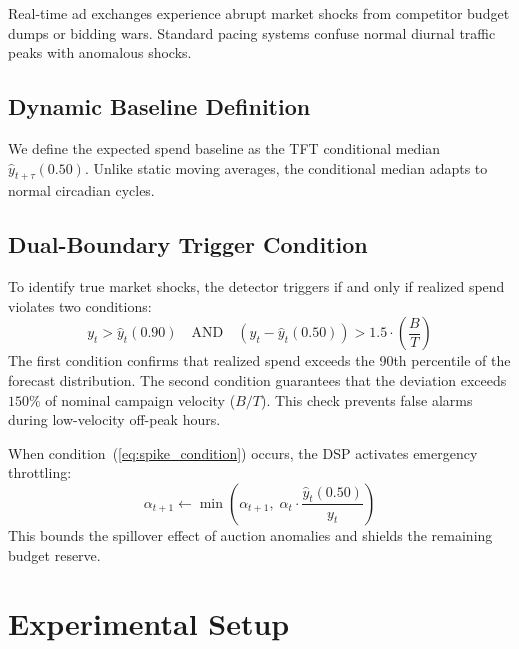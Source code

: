 \documentclass[sigconf]{acmart}
\begin{document}
Real-time ad exchanges experience abrupt market shocks from competitor budget dumps or bidding wars. Standard pacing systems confuse normal diurnal traffic peaks with anomalous shocks.

\subsection{Dynamic Baseline Definition}
We define the expected spend baseline as the TFT conditional median $\hat{y}_{t+\tau}(0.50)$. Unlike static moving averages, the conditional median adapts to normal circadian cycles.

\subsection{Dual-Boundary Trigger Condition}
To identify true market shocks, the detector triggers if and only if realized spend violates two conditions:
\begin{equation}
  y_t > \hat{y}_t(0.90) \quad \text{AND} \quad \left(y_t - \hat{y}_t(0.50)\right) > 1.5 \cdot \left(\frac{B}{T}\right)
  \label{eq:spike_condition}
\end{equation}
The first condition confirms that realized spend exceeds the 90th percentile of the forecast distribution. The second condition guarantees that the deviation exceeds $150\%$ of nominal campaign velocity ($B/T$). This check prevents false alarms during low-velocity off-peak hours.

When condition~(\ref{eq:spike_condition}) occurs, the DSP activates emergency throttling:
\begin{equation}
  \alpha_{t+1} \leftarrow \min\left(\alpha_{t+1}, \; \alpha_t \cdot \frac{\hat{y}_t(0.50)}{y_t}\right)
\end{equation}
This bounds the spillover effect of auction anomalies and shields the remaining budget reserve.

\section{Experimental Setup}
\end{document}
